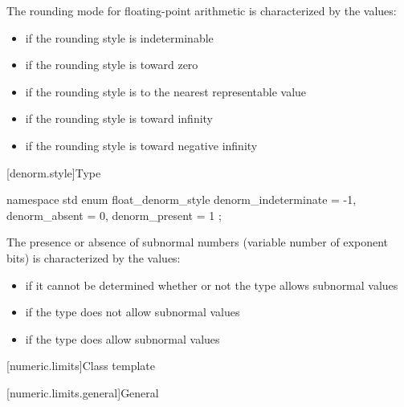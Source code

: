 \pnum
The rounding mode for floating-point arithmetic is characterized by the
values:
\begin{itemize}
\item
{}%
if the rounding style is indeterminable
\item
{}%
if the rounding style is toward zero
\item
{}%
if the rounding style is to the nearest representable value
\item
{}%
if the rounding style is toward infinity
\item
{}%
if the rounding style is toward negative infinity
\end{itemize}

[denorm.style]{Type }

%
\begin{codeblock}
namespace std {
  enum float_denorm_style {
    denorm_indeterminate = -1,
    denorm_absent = 0,
    denorm_present = 1
  };
}
\end{codeblock}

%
%
%
%
\pnum
The presence or absence of subnormal numbers (variable number of exponent bits)
is characterized by the values:
\begin{itemize}
\item
{}%
if it cannot be determined whether or not the type allows subnormal values
\item
{}%
if the type does not allow subnormal values
\item
{}%
if the type does allow subnormal values
\end{itemize}

[numeric.limits]{Class template }

[numeric.limits.general]{General}

